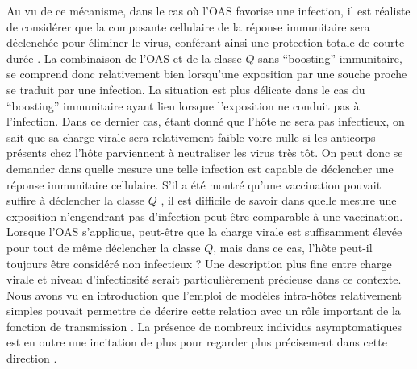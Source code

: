 Au vu de ce mécanisme, dans le cas où l'OAS favorise une infection, il
est réaliste de considérer que la composante cellulaire de la réponse
immunitaire sera déclenchée pour éliminer le virus, conférant ainsi
une protection totale de courte durée \citep{Grebe2008}. La
combinaison de l'OAS et de la classe $Q$ sans ``boosting''
immunitaire, se comprend donc relativement bien lorsqu'une exposition
par une souche proche se traduit par une infection. La situation est
plus délicate dans le cas du ``boosting'' immunitaire ayant lieu
lorsque l'exposition ne conduit pas à l'infection. Dans ce dernier
cas, étant donné que l'hôte ne sera pas infectieux, on sait que sa
charge virale sera relativement faible voire nulle si les anticorps
présents chez l'hôte parviennent à neutraliser les virus très tôt. On
peut donc se demander dans quelle mesure une telle infection est
capable de déclencher une réponse immunitaire cellulaire. S'il a été
montré qu'une vaccination pouvait suffire à déclencher la classe $Q$
\citep{Slepushkin1959}, il est difficile de savoir dans quelle mesure
une exposition n'engendrant pas d'infection peut être comparable à une
vaccination. Lorsque l'OAS s'applique, peut-être que la charge virale
est suffisamment élevée pour tout de même déclencher la classe $Q$,
mais dans ce cas, l'hôte peut-il toujours être considéré non
infectieux ? Une description plus fine entre charge virale et niveau
d'infectiosité serait particulièrement précieuse dans ce contexte.
Nous avons vu en introduction que l'emploi de modèles intra-hôtes
relativement simples pouvait permettre de décrire cette relation avec
un rôle important de la fonction de transmission \citep{King2009}. La
présence de nombreux individus asymptomatiques est en outre une
incitation de plus pour regarder plus précisement dans cette direction
\citep{Carrat2008}.


